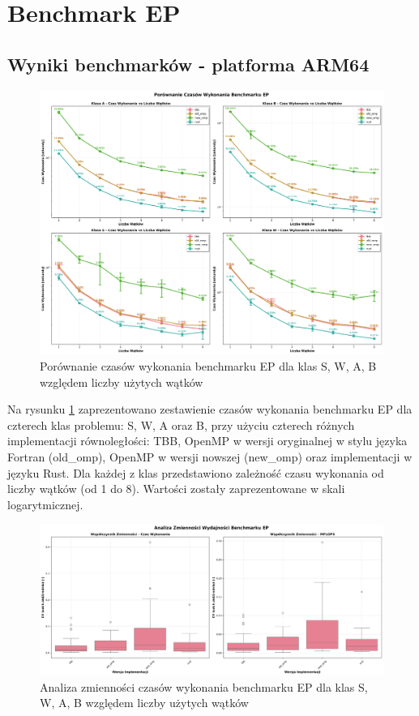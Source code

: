 
\section{Benchmark EP}
\subsection{Wyniki benchmarków - platforma ARM64}
\begin{figure}[H]
    \centering
    \includegraphics[width=\textwidth]{analiza/images/parallel/ep/ep_porownanie_czasow_wykonania.png}
    \caption{Porównanie czasów wykonania benchmarku EP dla klas S, W, A, B względem liczby użytych wątków}
    \label{ep_porownanie_czasow_wykonania}
\end{figure}

Na rysunku \ref{ep_porownanie_czasow_wykonania} zaprezentowano zestawienie czasów wykonania benchmarku EP dla czterech klas problemu: S, W, A oraz B, przy użyciu czterech różnych implementacji równoległości: TBB, OpenMP w wersji oryginalnej w stylu języka Fortran (old\_omp), OpenMP w wersji nowszej (new\_omp) oraz implementacji w języku Rust. Dla każdej z klas przedstawiono zależność czasu wykonania od liczby wątków (od 1 do 8). Wartości zostały zaprezentowane w skali logarytmicznej.

\begin{figure}[H]
    \centering
    \includegraphics[width=\textwidth]{analiza/images/parallel/ep/ep_analiza_zmiennosci.png}
    \caption{Analiza zmienności czasów wykonania benchmarku EP dla klas S, W, A, B względem liczby użytych wątków}
    \label{ep_analiza_zmiennosci}
\end{figure}

